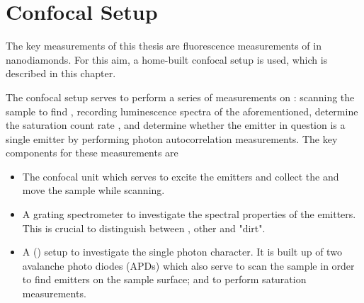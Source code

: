 
\chapter{Confocal Setup}	\label{ch::confocal_setup}

	The key measurements of this thesis are fluorescence measurements of \sivs in nanodiamonds.
	For this aim, a home-built confocal setup is used, which is described in this chapter.

	The confocal setup serves to perform a series of measurements on \fl: scanning the sample to find \sivs, recording luminescence spectra of the aforementioned, determine the saturation count rate , and determine whether the emitter in question is a single emitter by performing photon autocorrelation measurements.
	The key components for these measurements are 

	\begin{itemize}
		\item The confocal unit which serves to excite the emitters and collect the \fl and move the sample while scanning.
		\item A grating spectrometer to investigate the spectral properties of the emitters. This is crucial to distinguish between \sivs, other \ccs and "dirt".
		\item A \keyword{\HBT} (\hbt) setup to investigate the single photon character. It is built up of two avalanche photo diodes (APDs) which also serve to scan the sample in order to find emitters on the sample surface; and to perform saturation measurements.
	\end{itemize}

